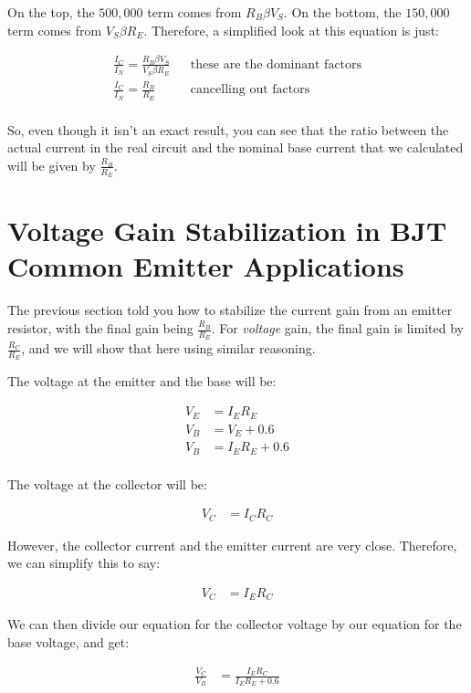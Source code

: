 On the top, the $500,000$ term comes from $R_B \beta V_S$.
On the bottom, the $150,000$ term comes from $V_S \beta R_E$.
Therefore, a simplified look at this equation is just:

\begin{align*}
\frac{I_C}{I_N} = \frac{R_B \beta V_S}{V_S \beta R_E} && \textrm{these are the dominant factors} \\
\frac{I_C}{I_N} = \frac{R_B}{R_E} && \textrm{cancelling out factors} \\
\end{align*}

So, even though it isn't an exact result, you can see that the ratio between the actual current in the real circuit and the nominal base current that we calculated will be given by $\frac{R_B}{R_E}$.

\section{Voltage Gain Stabilization in BJT Common Emitter Applications}
\label{apTransistorVoltageGain}

The previous section told you how to stabilize the current gain from an emitter resistor, with the final gain being $\frac{R_B}{R_E}$.
For \emph{voltage} gain, the final gain is limited by $\frac{R_C}{R_E}$, and we will show that here using similar reasoning.

The voltage at the emitter and the base will be:

\begin{align*}
V_E &= I_E R_E \\
V_B &= V_E + 0.6 \\
V_B &= I_E R_E + 0.6 \\
\end{align*}

The voltage at the collector will be:

\begin{align*}
V_C &= I_C R_C
\end{align*}

However, the collector current and the emitter current are very close.
Therefore, we can simplify this to say:

\begin{align*}
V_C &= I_E R_C
\end{align*}

We can then divide our equation for the collector voltage by our equation for the base voltage, and get:

\begin{align*}
\frac{V_C}{V_B} &= \frac{I_E R_C}{I_E R_E + 0.6}
\end{align*}

